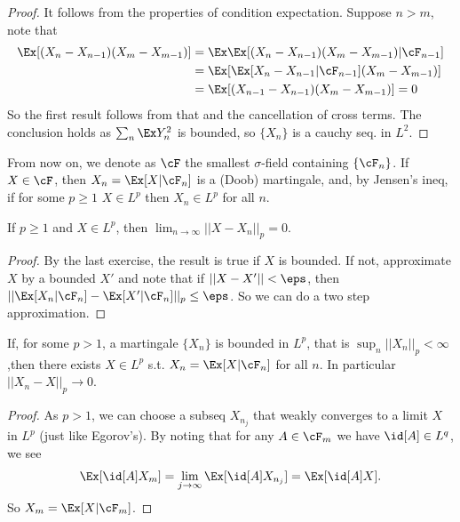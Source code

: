 \begin{proof}
	It follows from the properties of condition expectation. Suppose $n
	> m$, note that
	\\
	\begin{align*}
		\Ex[(X_n - X_{n-1})(X_m - X_{m-1})] & = \Ex\Ex[(X_n - X_{n-1})(X_m -
		X_{m-1}) | \cF_{n-1}]
		\\
		& = \Ex[\Ex[X_n - X_{n-1}| \cF_{n-1}](X_m - X_{m-1})] \\
		& = \Ex[(X_{n-1} - X_{n-1})(X_m - X_{m-1})] = 0
	\end{align*}
	So the first result follows from that and the cancellation of cross
	terms. The conclusion holds as $\sum_n \Ex Y_n^2$ is bounded,
	so $\{X_n\}$ is a cauchy seq. in $L^2$.
\end{proof}

From now on, we denote as $\cF$ the smallest $\sigma$-field
containing $\{\cF_n\}$. If $X \in \cF$, then $X_n = \Ex[X | \cF_n]$
is a (Doob) martingale,
and, by Jensen's ineq, if for some $p \geq 1$ $X \in L^p$ then $X_n
\in L^p$ for all $n$.

\begin{theorem}
	If $p \geq 1$ and $X \in L^p$, then $\lim_{n\to\infty} ||X - X_n||_p = 0$.
\end{theorem}

\begin{proof}
	By the last exercise, the result is true if $X$ is bounded. If not,
	approximate $X$ by a bounded $X'$
	and note that if $||X - X'|| < \eps$, then $||\Ex[X_n | \cF_n]  -
	\Ex[X'|\cF_n]||_p \leq \eps$.
	So we can do a two step approximation.
\end{proof}

\begin{theorem}
	If, for some $p > 1$, a martingale $\{X_n\}$ is bounded in $L^p$,
	that is $\sup_n ||X_n||_p < \infty$,then there exists $X \in L^p$ s.t.
	$X_n = \Ex[X | \cF_n]$ for all $n$. In particular $||X_n - X||_p \to 0$.
\end{theorem}

\begin{proof}
	As $p > 1$, we can choose a subseq $X_{n_j}$ that weakly converges
	to a limit $X$ in $L^p$ (just like Egorov's).
	By noting that for any $A \in \cF_m$ we have $\id[A] \in L^q$, we see
	\[
		\Ex[\id[A]X_m] = \lim_{j \to \infty} \Ex[\id[A]X_{n_j}] = \Ex[\id[A]X].
	\]
	So $X_m = \Ex[X | \cF_m]$.
\end{proof}

